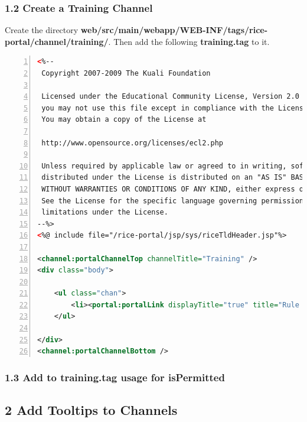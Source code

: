 \subsubsection*{1.2 Create a Training Channel}
Create the directory
\textbf{web/src/main/webapp/WEB-INF/tags/rice-portal/channel/training/}. Then
add the following \textbf{training.tag} to it.

\begin{lstlisting}[basicstyle=\scriptsize,numbers=left,language=xml,backgroundcolor=\color{ubergray},caption={web/src/main/webapp/WEB-INF/tags/rice-portal/trainingTab.tag},frame=single,breaklines=true]
<%--
 Copyright 2007-2009 The Kuali Foundation
 
 Licensed under the Educational Community License, Version 2.0 (the "License");
 you may not use this file except in compliance with the License.
 You may obtain a copy of the License at
 
 http://www.opensource.org/licenses/ecl2.php
 
 Unless required by applicable law or agreed to in writing, software
 distributed under the License is distributed on an "AS IS" BASIS,
 WITHOUT WARRANTIES OR CONDITIONS OF ANY KIND, either express or implied.
 See the License for the specific language governing permissions and
 limitations under the License.
--%>
<%@ include file="/rice-portal/jsp/sys/riceTldHeader.jsp"%>

<channel:portalChannelTop channelTitle="Training" />
<div class="body">
	
   	<ul class="chan">
		<li><portal:portalLink displayTitle="true" title="Rule Attribute" url="${ConfigProperties.kr.url}/lookup.do?businessObjectClassName=org.kuali.rice.kew.rule.bo.RuleAttribute&docFormKey=88888888&returnLocation=${ConfigProperties.application.url}/portal.do&hideReturnLink=true" /></li>
	</ul>

</div>
<channel:portalChannelBottom />
\end{lstlisting}

\subsubsection{1.3 Add to training.tag usage for isPermitted}

\subsection*{2 Add Tooltips to Channels}

